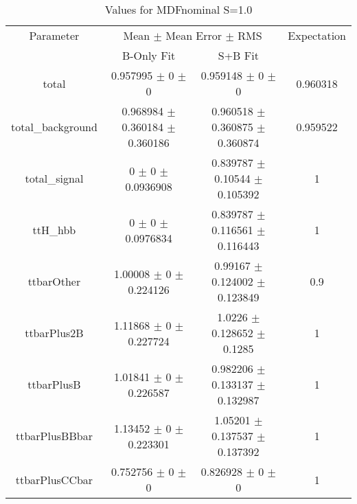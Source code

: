 \begin{table}
\centering
\caption{Values for MDFnominal S=1.0}
\begin{tabular}{cccc}
\toprule
Parameter & \multicolumn{2}{c}{Mean $\pm$ Mean Error $\pm$ RMS} & Expectation\\
 & B-Only Fit & S+B Fit & \\
\midrule
total & \num{0.957995} $\pm$ \num{0} $\pm$ \num{0} & \num{0.959148} $\pm$ \num{0} $\pm$ \num{0} & \num{0.960318}\\
total\_background & \num{0.968984} $\pm$ \num{0.360184} $\pm$ \num{0.360186} & \num{0.960518} $\pm$ \num{0.360875} $\pm$ \num{0.360874} & \num{0.959522}\\
total\_signal & \num{0} $\pm$ \num{0} $\pm$ \num{0.0936908} & \num{0.839787} $\pm$ \num{0.10544} $\pm$ \num{0.105392} & \num{1}\\
ttH\_hbb & \num{0} $\pm$ \num{0} $\pm$ \num{0.0976834} & \num{0.839787} $\pm$ \num{0.116561} $\pm$ \num{0.116443} & \num{1}\\
ttbarOther & \num{1.00008} $\pm$ \num{0} $\pm$ \num{0.224126} & \num{0.99167} $\pm$ \num{0.124002} $\pm$ \num{0.123849} & \num{0.9}\\
ttbarPlus2B & \num{1.11868} $\pm$ \num{0} $\pm$ \num{0.227724} & \num{1.0226} $\pm$ \num{0.128652} $\pm$ \num{0.1285} & \num{1}\\
ttbarPlusB & \num{1.01841} $\pm$ \num{0} $\pm$ \num{0.226587} & \num{0.982206} $\pm$ \num{0.133137} $\pm$ \num{0.132987} & \num{1}\\
ttbarPlusBBbar & \num{1.13452} $\pm$ \num{0} $\pm$ \num{0.223301} & \num{1.05201} $\pm$ \num{0.137537} $\pm$ \num{0.137392} & \num{1}\\
ttbarPlusCCbar & \num{0.752756} $\pm$ \num{0} $\pm$ \num{0} & \num{0.826928} $\pm$ \num{0} $\pm$ \num{0} & \num{1}\\
\bottomrule
\end{tabular}
\end{table}